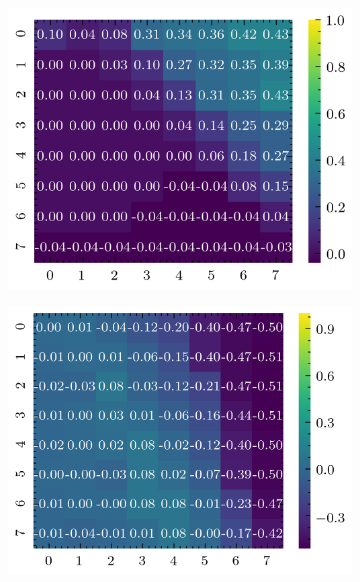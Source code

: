 \begin{figure}[H]
    \begin{subfigure}[b]{0.19\textwidth}
        \includegraphics[width=\linewidth]{../img/5/quarry/false_negative/heatmap-2d-0.png}
    \end{subfigure}
    \begin{subfigure}[b]{0.19\textwidth}
        \includegraphics[width=\linewidth]{../img/5/quarry/false_negative/heatmap-2d-1.png}
    \end{subfigure}  
    \begin{subfigure}[b]{0.19\textwidth}

\end{subfigure}
\end{figure}
